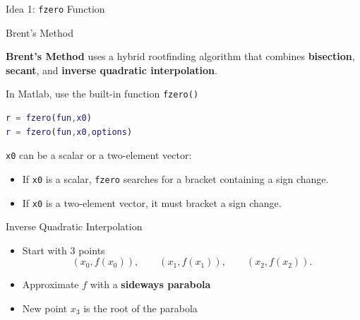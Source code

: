 \documentclass[10pt]{beamer}
\begin{document}
\begin{frame}[fragile]{Idea 1: \texttt{fzero} Function}


\begin{block}{Brent's Method}
    
\textbf{Brent's Method} uses a hybrid rootfinding algorithm that combines
\textbf{bisection}, \textbf{secant}, and
\textbf{inverse quadratic interpolation}.
\end{block}


\vspace{3ex}
In Matlab, use the built-in function \texttt{fzero()}
\begin{lstlisting}[language=matlab]
r = fzero(fun,x0)
r = fzero(fun,x0,options)
\end{lstlisting}

\vspace{3ex}

\texttt{x0} can be a scalar or a two-element vector:
\begin{itemize}
    \item If \texttt{x0} is a scalar, \texttt{fzero} searches
          for a bracket containing a sign change.

    \item If \texttt{x0} is a two-element vector, it must
          bracket a sign change.
\end{itemize}

\end{frame}
\begin{frame}{Inverse Quadratic Interpolation}

\begin{itemize}
    \item Start with 3 points 
\[
(x_0,f(x_0)),\qquad
(x_1,f(x_1)),\qquad
(x_2,f(x_2)).
\]
\item Approximate $f$ with a \textbf{sideways parabola}
\item New point $x_3$ is the root of the parabola
\end{itemize}

\begin{center}
\end{center}

\end{frame}

\end{document}

